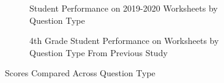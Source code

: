 \begin{figure}
     \centering
     \begin{subfigure}[t]{0.49\textwidth}
        \caption{Student Performance on 2019-2020 \ts Worksheets by Question Type}
        \label{fig:observe_predict_explore}
    \end{subfigure}
    \hfill
    \begin{subfigure}[t]{0.49\textwidth}
        \caption{4th Grade Student Performance on \ts Worksheets by Question Type From Previous Study}
        \label{fig:observe_predict_explore_4th}
    \end{subfigure}
    \caption{\ts Scores Compared Across Question Type}
    
\end{figure}

